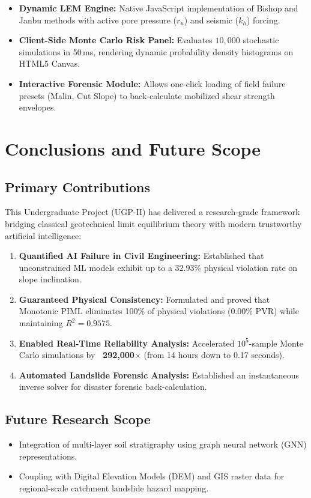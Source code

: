 \documentclass[12pt,a4paper,oneside]{report}
\begin{document}
\begin{itemize}
  \item \textbf{Dynamic LEM Engine:} Native JavaScript implementation of Bishop and Janbu methods with active pore pressure ($r_u$) and seismic ($k_h$) forcing.
  \item \textbf{Client-Side Monte Carlo Risk Panel:} Evaluates $10,000$ stochastic simulations in 50\,ms, rendering dynamic probability density histograms on HTML5 Canvas.
  \item \textbf{Interactive Forensic Module:} Allows one-click loading of field failure presets (Malin, Cut Slope) to back-calculate mobilized shear strength envelopes.
\end{itemize}

\chapter{Conclusions and Future Scope}

\section{Primary Contributions}
This Undergraduate Project (UGP-II) has delivered a research-grade framework bridging classical geotechnical limit equilibrium theory with modern trustworthy artificial intelligence:
\begin{enumerate}
  \item \textbf{Quantified AI Failure in Civil Engineering:} Established that unconstrained ML models exhibit up to a 32.93\% physical violation rate on slope inclination.
  \item \textbf{Guaranteed Physical Consistency:} Formulated and proved that Monotonic PIML eliminates 100\% of physical violations ($0.00\%$ PVR) while maintaining $R^2 = 0.9575$.
  \item \textbf{Enabled Real-Time Reliability Analysis:} Accelerated $10^5$-sample Monte Carlo simulations by \textbf{~292,000$\times$} (from 14 hours down to 0.17 seconds).
  \item \textbf{Automated Landslide Forensic Analysis:} Established an instantaneous inverse solver for disaster forensic back-calculation.
\end{enumerate}

\section{Future Research Scope}
\begin{itemize}
  \item Integration of multi-layer soil stratigraphy using graph neural network (GNN) representations.
  \item Coupling with Digital Elevation Models (DEM) and GIS raster data for regional-scale catchment landslide hazard mapping.
\end{itemize}
\end{document}
